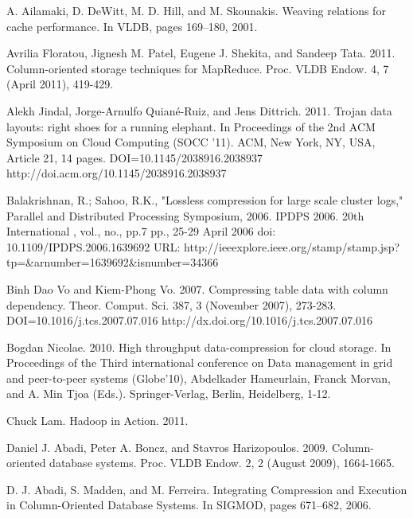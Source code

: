 \documentclass[twocolumn]{article}
\begin{document}
{\small
\begin{thebibliography}{10}

 A. Ailamaki, D. DeWitt, M. D. Hill, and M. Skounakis.
                Weaving relations for cache performance. In VLDB, pages
                169–180, 2001.

 Avrilia Floratou, Jignesh M. Patel, Eugene J. Shekita, and Sandeep
		Tata. 2011. Column-oriented storage techniques for MapReduce.
		Proc. VLDB Endow. 4, 7 (April 2011), 419-429.

 Alekh Jindal, Jorge-Arnulfo Quiané-Ruiz, and Jens Dittrich. 2011.
                Trojan data layouts: right shoes for a running elephant.
                In Proceedings of the 2nd ACM Symposium on Cloud Computing
                (SOCC '11). ACM, New York, NY, USA, Article 21, 14 pages.
                DOI=10.1145/2038916.2038937 http://doi.acm.org/10.1145/2038916.2038937

	Balakrishnan, R.; Sahoo, R.K., "Lossless compression 
		for large scale cluster logs," Parallel and Distributed Processing 
		Symposium, 2006. IPDPS 2006. 20th International , vol., no., pp.7 pp., 
		25-29 April 2006 doi: 10.1109/IPDPS.2006.1639692
		URL: http://ieeexplore.ieee.org/stamp/stamp.jsp? tp=\&arnumber=1639692\&isnumber=34366

 Binh Dao Vo and Kiem-Phong Vo. 2007. Compressing table data
                with column dependency. Theor. Comput. Sci. 387, 3
                (November 2007), 273-283. DOI=10.1016/j.tcs.2007.07.016
                http://dx.doi.org/10.1016/j.tcs.2007.07.016

 Bogdan Nicolae. 2010. High throughput data-compression for cloud
                storage. In Proceedings of the Third international
                conference on Data management in grid and peer-to-peer
                systems (Globe'10), Abdelkader Hameurlain, Franck Morvan,
                and A. Min Tjoa (Eds.). Springer-Verlag, Berlin,
                Heidelberg, 1-12.

 Chuck Lam.  Hadoop in Action.  2011.

 Daniel J. Abadi, Peter A. Boncz, and Stavros Harizopoulos. 2009.
                Column-oriented database systems. Proc. VLDB Endow. 2,
                2 (August 2009), 1664-1665.

 D. J. Abadi, S. Madden, and M. Ferreira. Integrating
                Compression and Execution in Column-Oriented Database
                Systems. In SIGMOD, pages 671–682, 2006.


\end{thebibliography}}
\end{document}
